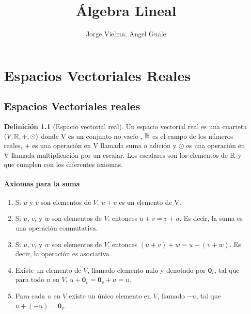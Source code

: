 \documentclass[10pt,a4paper]{report}
\author{Jorge Vielma, Angel Guale}
\title{Álgebra Lineal}
\theoremstyle{definition}
\newtheorem{dfn}{Definición}[chapter]
\theoremstyle{remark}
\numberwithin{section}{chapter}
\numberwithin{equation}{chapter}
\numberwithin{tacounter}{chapter}
\begin{document}
\maketitle
\setcounter{page}{4}
\tableofcontents

\printindex
\chapter{Espacios Vectoriales Reales}
\section{Espacios Vectoriales reales}

\begin{dfn}[Espacio vectorial real]
Un espacio vectorial real es una cuarteta $(V, \mathbb{R}, +, \odot)$ donde V es un conjunto no vacío , $\mathbb{R}$ es el campo de los números reales, + es una operación en V llamada suma o adición y $\odot$ es una operación en V llamada multiplicación por un escalar. Los escalares son los elementos de $\mathbb{R}$ y que cumplen con los diferentes axiomas. 


\end{dfn}
\subsubsection*{Axiomas para la suma}
\begin{enumerate}
\item Si $u$ y $v$ son elementos de $V$, $u+v$ es un elemento de V.
\item Si $u$, $v$, y $w$ son elementos de $V$, entonces $u+v=v+u$. Es decir, la suma es una operación conmutativa.
\item Si $u$, $v$, y $w$ son elementos de $V$, entonces  $(u+v)+w=u+(v+w)$. Es decir, la operación es asociativa.
\item Existe un elemento de $V$, llamado elemento nulo y denotado por $\mathbf{0}_v$, tal que para todo $u$ en $V$, $u + \mathbf{0}_v = \mathbf{0}_v +u = u$.
\item Para cada $u$ en $V$ existe un único elemento en $V$, llamado $-u$, tal que $u+(-u)=\mathbf{0}_v$.
\end{enumerate}
\end{document}
